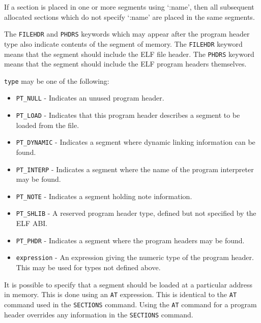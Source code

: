 \documentclass[a4paper,12pt,twoside]{report}
\begin{document}
                If a section is placed in one or more segments using `:name', then all subsequent allocated sections which do not specify `:name' are placed in the same segments.\cite{gnuldProgramHeaders}

                The \lstinline|FILEHDR| and \lstinline|PHDRS| keywords which may appear after the program header type also indicate contents of the segment of memory. The \lstinline|FILEHDR| keyword means that the segment should include the ELF file header. The \lstinline|PHDRS| keyword means that the segment should include the ELF program headers themselves.\cite{gnuldProgramHeaders}

                \lstinline|type| may be one of the following\cite{gnuldProgramHeaders}:
                \begin{itemize}
                    \item \lstinline|PT_NULL| - Indicates an unused program header.
                    \item \lstinline|PT_LOAD| - Indicates that this program header describes a segment to be loaded from the file.
                    \item \lstinline|PT_DYNAMIC| - Indicates a segment where dynamic linking information can be found.
                    \item \lstinline|PT_INTERP| - Indicates a segment where the name of the program interpreter may be found.
                    \item \lstinline|PT_NOTE| - Indicates a segment holding note information.
                    \item \lstinline|PT_SHLIB| - A reserved program header type, defined but not specified by the ELF ABI.
                    \item \lstinline|PT_PHDR| - Indicates a segment where the program headers may be found.
                    \item \lstinline|expression| - An expression giving the numeric type of the program header. This may be used for types not defined above.
                \end{itemize}

                It is possible to specify that a segment should be loaded at a particular address in memory. This is done using an \lstinline|AT| expression. This is identical to the \lstinline|AT| command used in the \lstinline|SECTIONS| command. Using the \lstinline|AT| command for a program header overrides any information in the \lstinline|SECTIONS| command.\cite{gnuldProgramHeaders}
\end{document}

